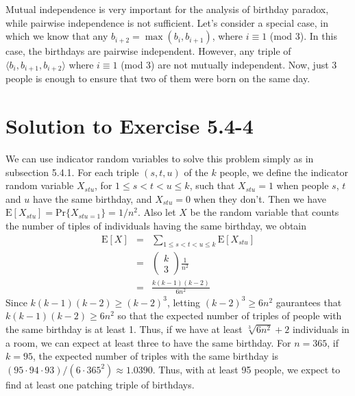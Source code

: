 \documentclass[a4paper, fleqn]{article}
\begin{document}
Mutual independence is very important for the analysis of birthday paradox,
while pairwise independence is not sufficient. Let's consider a special case,
in which we know that any $b_{i+2} = \max(b_{i}, b_{i+1})$, where $i \equiv 1$
(mod 3). In this case, the birthdays are pairwise independent. However, any
triple of $\langle b_{i}, b_{i+1}, b_{i+2} \rangle$ where $i \equiv 1$ (mod 3)
are not mutually independent. Now, just 3 people is enough to ensure that two
of them were born on the same day.







\section*{Solution to Exercise 5.4-4}

We can use indicator random variables to solve this problem simply as in
subsection 5.4.1. For each triple $(s,t,u)$ of the $k$ people, we define the
indicator random variable $X_{stu}$, for $1 \leq s < t < u \leq k$, such that
$X_{stu} = 1$ when people $s$, $t$ and $u$ have the same birthday, and $X_{stu} 
= 0$ when they don't. Then we have $\mbox{E}[X_{stu}] = \mbox{Pr}\{X_{stu = 
1}\} = 1/n^2$. Also let $X$ be the random variable that counts the number of 
tiples of individuals having the same birthday, we obtain
\begin{eqnarray*}
\mbox{E}[X] & = & \sum_{1 \leq s < t < u \leq k} \mbox{E}[X_{stu}] \\
            & = & \left(\!\begin{array}{c}k \\
                  3\end{array}\!\right) \frac{1}{n^2} \\
            & = & \frac{k(k - 1)(k - 2)}{6n^2}
\end{eqnarray*}
Since $k(k-1)(k-2) \geq (k-2)^3$, letting $(k-2)^3 \geq 6n^2$ gaurantees that 
$k(k-1)(k-2) \geq 6n^2$ so that the expected number of triples of people with 
the same birthday is at least 1. Thus, if we have at least $\sqrt[3]{6n^2} + 2$ 
individuals in a room, we can expect at least three to have the same birthday. 
For $n = 365$, if $k = 95$, the expected number of triples  with the same birthday 
is $(95 \cdot 94 \cdot 93)/(6 \cdot 365^2) \approx 1.0390$. Thus, with at least 
95 people, we expect to find at least one patching triple of birthdays.
\end{document}
